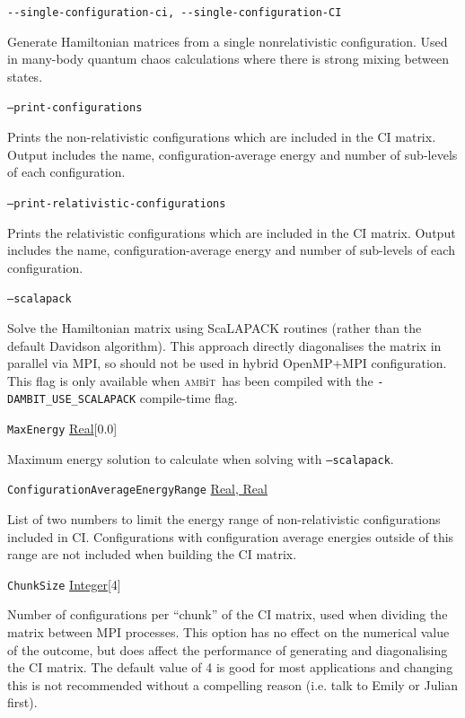 \documentclass{report}
\newcommand{\ambit}{\textsc{amb}{\footnotesize i}\textsc{t}}
\begin{document}
\texttt{{-}{-}single-configuration-ci, {-}{-}single-configuration-CI}
\begin{adjustwidth}{1cm}{}
Generate Hamiltonian matrices from a single nonrelativistic configuration. Used in many-body quantum
chaos calculations where there is strong mixing between states.
\end{adjustwidth}

\texttt{--print-configurations}
\begin{adjustwidth}{1cm}{}
Prints the non-relativistic configurations which are included in the CI matrix.
Output includes the name, configuration-average energy and number of sub-levels of each configuration.
\end{adjustwidth}

\texttt{--print-relativistic-configurations}
\begin{adjustwidth}{1cm}{}
Prints the relativistic configurations which are included in the CI matrix.
Output includes the name, configuration-average energy and number of sub-levels of each configuration.
\end{adjustwidth}

\texttt{--scalapack}
\begin{adjustwidth}{1cm}{}
Solve the Hamiltonian matrix using ScaLAPACK routines (rather than the default Davidson algorithm). 
This approach directly diagonalises the matrix in parallel via MPI, so should not be used in hybrid
OpenMP+MPI configuration. This flag is only available when \ambit\ has been compiled with the
\texttt{-DAMBIT\_USE\_SCALAPACK} compile-time flag.
\end{adjustwidth}

\texttt{MaxEnergy} \uline{Real}[0.0]
\begin{adjustwidth}{1cm}{}
Maximum energy solution to calculate when solving with \texttt{--scalapack}.
\end{adjustwidth}

\texttt{ConfigurationAverageEnergyRange} \uline{Real, Real}
\begin{adjustwidth}{1cm}{}
List of two numbers to limit the energy range of non-relativistic configurations included in CI.
Configurations with configuration average energies outside of this range are not included when building
the CI matrix.
\end{adjustwidth}

\texttt{ChunkSize} \uline{Integer}[4]
\begin{adjustwidth}{1cm}{}
Number of configurations per ``chunk'' of the CI matrix, used when dividing the matrix between MPI
processes. This option has no effect on the numerical 
value of the outcome, but does affect the performance of generating and diagonalising the CI matrix. 
The default value of 4 is good for most applications and changing this is not recommended without a 
compelling reason (i.e. talk to Emily or Julian first).
\end{adjustwidth}
\end{document}
